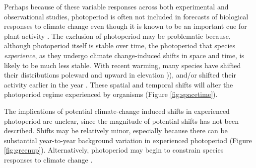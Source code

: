 \documentclass{article}
\begin{document}
\par Perhaps because of these variable responses across both experimental and observational studies, photoperiod is often not included in forecasts of biological responses to climate change even though it is known to be an important cue for plant activity \citet[but see ][]{duputie2015}. %
The exclusion of photoperiod may be problematic because, although photoperiod itself is stable over time, the photoperiod that species \emph{experience}, as they undergo climate change-induced shifts in space and time, is likely to be much less stable. With recent warming, many species have shifted their distributions poleward and upward in elevation \citep[i.e., range shifts][]{parmesan2006,chen2011,harsch2009})), and/or shifted their activity earlier in the year \citep[i.e., phenological shifts][]{parmesan2006, wolkovich2012}. These spatial and temporal shifts will alter the photoperiod regime experienced by organisms (Figure \ref{fig:spacetime}). 

\par The implications of potential climate-change induced shifts in experienced photoperiod are unclear, since the magnitude of potential shifts has not been described. Shifts may be relatively minor, especially because there can be substantial year-to-year background variation in experienced photoperiod (Figure \ref{fig:greenup}). Alternatively, photoperiod may begin to constrain species responses to climate change \citep{koerner2010b}.

\end{document}
